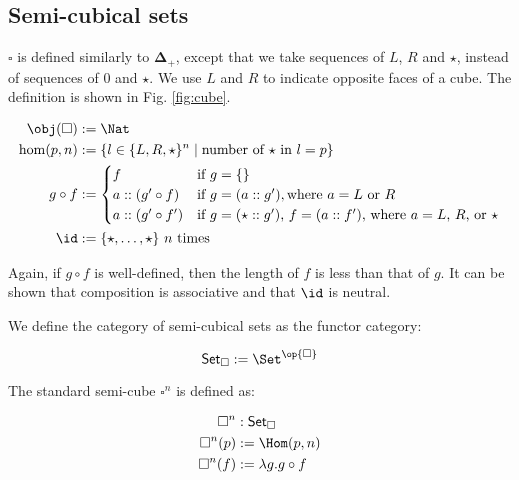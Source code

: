 \documentclass[10pt]{art.cls/art}
\newcommand{\DeltaPlus}{\ensuremath{\boldsymbol{\Delta}_+}}
\newcommand{\Cube}{\ensuremath{\boldsymbol{\square}}}
\newcommand{\CSet}{\ensuremath{\mathsf{Set}_{\boldsymbol{\square}}}}
\newcommand{\kstar}{{\star}}
\begin{document}
\subsection{Semi-cubical sets}
\begin{definition}[\Cube]
  $\Cube$ is defined similarly to $\DeltaPlus$, except that we take sequences of $L$, $R$ and $\star$, instead of sequences of $0$ and $\kstar$. We use $L$ and $R$ to indicate opposite faces of a cube. The definition is shown in Fig. \ref{fig:cube}.

  \begin{figure*}[!t]
    \begin{align*}
      \obj(\Cube) & := \Nat                                                                                \\
      \hom(p, n)  & := \{l \in \{L, R, \kstar\}^n \mid \text{number of $\kstar$ in $l = p$}\}              \\
      g \circ f   & :=
      \begin{cases}
        f                  & \text{if $g = \{\}$}                                                            \\
        a :: (g' \circ f)  & \text{if $g = (a :: g')$}, \text{where $a = L$ or $R$}                          \\
        a :: (g' \circ f') & \text{if $g = (\star :: g')$, $f = (a :: f')$, where $a = L$, $R$, or $\kstar$} \\
      \end{cases} \\
      \id         & := \{\kstar, \ldots, \kstar\} \text{ $n$ times}
    \end{align*}
    \caption{Definition of \Cube}\label{fig:cube}
  \end{figure*}

  Again, if $g \circ f$ is well-defined, then the length of $f$ is less than that of $g$. It can be shown that composition is associative and that $\id$ is neutral.
\end{definition}

\begin{definition}[\CSet]
  We define the category of semi-cubical sets as the functor category:

  \begin{equation*}
    \CSet := \Set^{\op{\Cube}}
  \end{equation*}
\end{definition}

\begin{definition}[$\Cube^n$]
  The standard semi-cube $\Cube^n$ is defined as:

  \begin{align*}
    \Cube^n    & : \CSet                  \\
    \Cube^n(p) & := \Hom(p, n)            \\
    \Cube^n(f) & := \lambda g . g \circ f
  \end{align*}
\end{definition}
\end{document}
